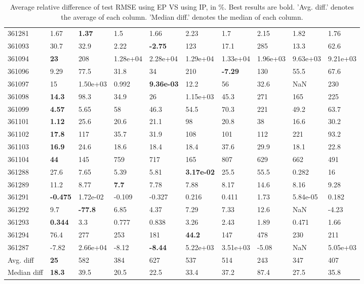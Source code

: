 \begin{table}[ht!]
\begin{tabular}{llllllllll}
  361281 & 1.67 & \textbf{1.37} & 1.5 & 1.66 & 2.23 & 1.7 & 2.15 & 1.82 & 1.76 \\ 
  361093 & 30.7 & 32.9 & 2.22 & \textbf{-2.75} & 123 & 17.1 & 285 & 13.3 & 62.6 \\ 
  361094 & \textbf{23} & 208 & 1.28e+04 & 2.28e+04 & 1.29e+04 & 1.33e+04 & 1.96e+03 & 9.63e+03 & 9.21e+03 \\ 
  361096 & 9.29 & 77.5 & 31.8 & 34 & 210 & \textbf{-7.29} & 130 & 55.5 & 67.6 \\ 
  361097 & 15 & 1.50e+03 & 0.992 & \textbf{9.36e-03} & 12.2 & 56 & 32.6 & NaN & 230 \\ 
  361098 & \textbf{14.3} & 98.3 & 34.9 & 26 & 1.15e+03 & 45.3 & 271 & 165 & 225 \\ 
  361099 & \textbf{4.57} & 5.65 & 58 & 46.3 & 54.5 & 70.3 & 221 & 49.2 & 63.7 \\ 
  361101 & \textbf{1.12} & 25.6 & 20.6 & 21.1 & 98 & 20.8 & 38 & 16.6 & 30.2 \\ 
  361102 & \textbf{17.8} & 117 & 35.7 & 31.9 & 108 & 101 & 112 & 221 & 93.2 \\ 
  361103 & \textbf{16.9} & 24.6 & 18.6 & 18.4 & 18.4 & 37.6 & 29.9 & 18.1 & 22.8 \\ 
  361104 & \textbf{44} & 145 & 759 & 717 & 165 & 807 & 629 & 662 & 491 \\ 
  361288 & 27.6 & 7.65 & 5.39 & 5.81 & \textbf{3.17e-02} & 25.5 & 55.5 & 0.282 & 16 \\ 
  361289 & 11.2 & 8.77 & \textbf{7.7} & 7.78 & 7.88 & 8.17 & 14.6 & 8.16 & 9.28 \\ 
  361291 & \textbf{-0.475} & 1.72e-02 & -0.109 & -0.327 & 0.216 & 0.411 & 1.73 & 5.84e-05 & 0.182 \\ 
  361292 & 9.7 & \textbf{-77.8} & 6.85 & 4.37 & 7.29 & 7.33 & 12.6 & NaN & -4.23 \\ 
  361293 & \textbf{0.344} & 3.3 & 0.777 & 0.838 & 3.26 & 2.43 & 1.89 & 0.471 & 1.66 \\ 
  361294 & 76.4 & 277 & 253 & 181 & \textbf{44.2} & 147 & 478 & 230 & 211 \\ 
  361287 & -7.82 & 2.66e+04 & -8.12 & \textbf{-8.44} & 5.22e+03 & 3.51e+03 & -5.08 & NaN & 5.05e+03 \\ 
   \hline
Avg. diff & \textbf{25} & 582 & 384 & 627 & 537 & 514 & 243 & 347 & 407 \\ 
  Median diff & \textbf{18.3} & 39.5 & 20.5 & 22.5 & 33.4 & 37.2 & 87.4 & 27.5 & 35.8 \\ 
   \hline
\hline
\end{tabular}
\endgroup
\caption{Average relative difference of test RMSE using EP VS using IP, in \%. 
                  Best results are bold. 
                  'Avg. diff.' denotes the average of each column.
                  'Median diff.' denotes the median of each column.} 
\label{TABLES/table_results_RMSE_only_num_features_EP_VS_IP}
\end{table}
